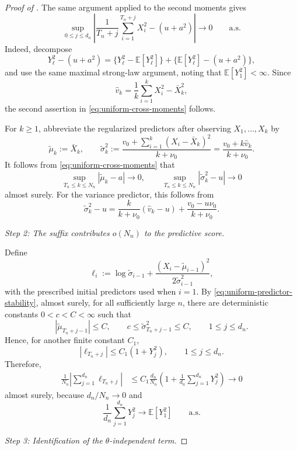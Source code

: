 \documentclass[12pt]{article}
\theoremstyle{spaced}
\theoremstyle{remark}
\newcommand{\E}{\mathbb E}
\begin{document}
\begin{proof}[Proof of ]
The same argument applied to the second moments gives
\[
\sup_{0\le j\le d_n}
\left|
\frac1{T_n+j}
\sum_{i=1}^{T_n+j}X_i^2-(u+a^2)
\right|
\longrightarrow0
\qquad\text{a.s.}
\]
Indeed, decompose
\[
Y_\ell^2-(u+a^2)
=
\bigl\{Y_\ell^2-\E[Y_\ell^2]\bigr\}
+
\bigl\{\E[Y_\ell^2]-(u+a^2)\bigr\},
\]
and use the same maximal strong-law argument, noting that
\(\E[Y_1^2]<\infty\).  Since
\[
\widehat v_k
=
\frac1k\sum_{i=1}^kX_i^2-\bar X_k^2,
\]
the second assertion in \eqref{eq:uniform-cross-moments} follows.

For \(k\ge1\), abbreviate the regularized predictors after observing
\(X_1,\ldots,X_k\) by
\[
\widetilde\mu_k:=\bar X_k,
\qquad
\widetilde\sigma_k^2
:=
\frac{
v_0+\sum_{i=1}^k(X_i-\bar X_k)^2
}{
k+\nu_0
}
=
\frac{v_0+k\widehat v_k}{k+\nu_0}.
\]
It follows from \eqref{eq:uniform-cross-moments} that
\begin{equation}
\label{eq:uniform-predictor-stability}
\sup_{T_n\le k\le N_n}
|\widetilde\mu_k-a|
\longrightarrow0,
\qquad
\sup_{T_n\le k\le N_n}
|\widetilde\sigma_k^2-u|
\longrightarrow0
\end{equation}
almost surely.  For the variance predictor, this follows from
\[
\widetilde\sigma_k^2-u
=
\frac{k}{k+\nu_0}(\widehat v_k-u)
+
\frac{v_0-u\nu_0}{k+\nu_0}.
\]

\medskip
\noindent
\textit{Step 2: The suffix contributes \(o(N_n)\) to the predictive
score.}

Define
\[
\ell_i
:=
\log\widetilde\sigma_{i-1}
+
\frac{(X_i-\widetilde\mu_{i-1})^2}
     {2\widetilde\sigma_{i-1}^2},
\]
with the prescribed initial predictors used when \(i=1\).  By
\eqref{eq:uniform-predictor-stability}, almost surely, for all
sufficiently large \(n\), there are deterministic constants
\(0<c<C<\infty\) such that
\[
|\widetilde\mu_{T_n+j-1}|\le C,
\qquad
c\le\widetilde\sigma_{T_n+j-1}^2\le C,
\qquad
1\le j\le d_n.
\]
Hence, for another finite constant \(C_1\),
\[
|\ell_{T_n+j}|
\le
C_1(1+Y_j^2),
\qquad 1\le j\le d_n.
\]
Therefore,
\begin{align}
\frac1{N_n}
\left|
\sum_{j=1}^{d_n}\ell_{T_n+j}
\right|
&\le
C_1\frac{d_n}{N_n}
\left(
1+\frac1{d_n}\sum_{j=1}^{d_n}Y_j^2
\right)
\longrightarrow0
\label{eq:suffix-score-negligible}
\end{align}
almost surely, because \(d_n/N_n\to0\) and
\[
\frac1{d_n}\sum_{j=1}^{d_n}Y_j^2
\longrightarrow
\E[Y_1^2]
\qquad\text{a.s.}
\]

\medskip
\noindent
\textit{Step 3: Identification of the \(\theta\)-independent term.}


\end{proof}
\end{document}
